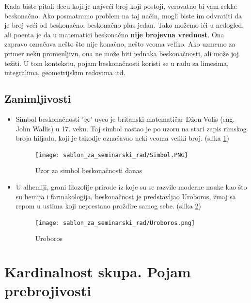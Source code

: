 \documentclass[a4paper]{article}
\begin{document}
Kada biste pitali decu koji je najveći broj koji postoji, verovatno bi vam rekla: beskonačno. Ako posmatramo problem na taj način, mogli biste im odvratiti da je broj veći od beskonačno: beskonačno plus jedan. Tako možemo ići u nedogled, ali poenta je da u matematici beskonačno \textbf{nije brojevna vrednost}. Ona zapravo označava nešto što nije konačno, nešto veoma veliko. Ako uzmemo za primer neku promenljivu, ona ne može biti jednaka beskonačnosti, ali može joj težiti. U tom kontekstu, pojam beskonačnosti koristi se u radu sa limesima, integralima, geometrijskim redovima itd.\\


\subsection{Zanimljivosti}

\begin{itemize}
    \item Simbol beskonačnosti '$\infty$' uveo je britanski matematičar Džon Volis (eng. John Wallis) u 17. veku. Taj simbol nastao je po uzoru na stari zapis rimskog broja hiljadu, koji je takodje označavao neki veoma veliki broj. (slika \ref{fig:Uzor za simbol beskonačnosti danas})
    
    \begin{figure}[ht!]
    \begin{center}
    \texttt{[image: sablon\_za\_seminarski\_rad/Simbol.PNG]}
    \end{center}
    \caption{Uzor za simbol beskonačnosti danas}
    \label{fig:Uzor za simbol beskonačnosti danas}
    \end{figure}
    
    \item U alhemiji, grani filozofije prirode iz koje su se razvile moderne nauke kao što su hemija i farmakologija, beskonačnost je predstavljao Uroboros, zmaj sa repom u ustima koji neprestano proždire samog sebe. (slika \ref{fig:Uroboros})
    
    \begin{figure}[ht!]
    \begin{center}
    \texttt{[image: sablon\_za\_seminarski\_rad/Uroboros.png]}
    \end{center}
    \caption{Uroboros}
    \label{fig:Uroboros}
    \end{figure}
\end{itemize}

\newpage

\section{Kardinalnost skupa. Pojam prebrojivosti}
\label{poglavlje:Kardinalnost. Pojam prebrojivosti}
\end{document}
